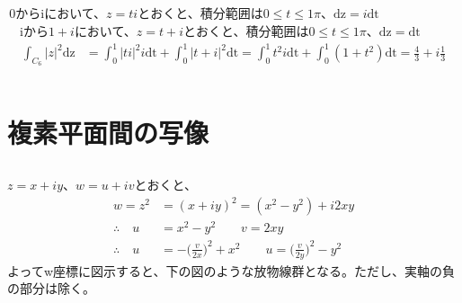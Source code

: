 \documentclass[dvipdfmx,a4paper]{jsarticle}
\begin{document}
\subsection{}
\,0からiにおいて、$z = ti$とおくと、積分範囲は$0 \leq t \leq 1\pi、\mathrm{dz} = i\mathrm{dt}$\\
　iから$1+i$において、$z = t+i$とおくと、積分範囲は$0 \leq t \leq 1\pi、\mathrm{dz} = \mathrm{dt}$
\begin{align*}
\int_{C_6}|z|^2\mathrm{dz} &= \int_{0}^{1}|ti|^2i\mathrm{dt} + \int_{0}^{1}|t+i|^2\mathrm{dt}
= \int_{0}^{1}t^2i\mathrm{dt} + \int_{0}^{1}(1+t^2)\mathrm{dt} 
= \frac{4}{3} + i\frac{1}{3}\\\\
\end{align*}


\section{複素平面間の写像}

\subsection{}
$z = x+iy、w = u+iv$とおくと、
\begin{align*}
w = z^2 &= (x+iy)^2 = (x^2-y^2) + i2xy\\
\therefore \quad u &= x^2-y^2 \qquad v = 2xy\\
\therefore \quad u &= - \bigl(\frac{v}{2x}\bigr)^2 + x^2 \qquad u =  \bigl(\frac{v}{2y}\bigr)^2 - y^2
\end{align*}
よってw座標に図示すると、下の図のような放物線群となる。ただし、実軸の負の部分は除く。
\end{document}
